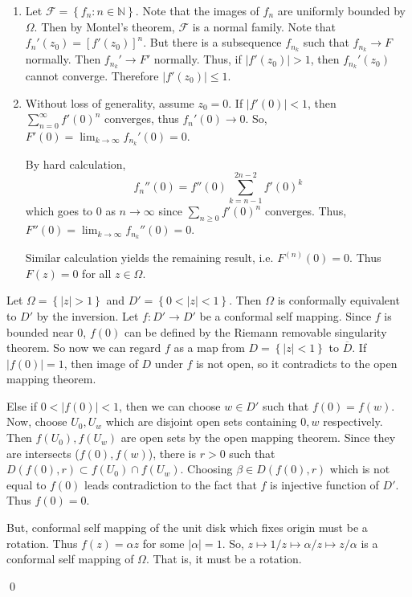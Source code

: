 \begin{problem}[7] \hfill

	\begin{enumerate}
		\item Let $\mathcal{F} = \left\{ f_n : n\in \mathbb{N} \right\}$. 
			Note that the images of $f_n$ are uniformly bounded by $\Omega$.
			Then by Montel's theorem, $\mathcal{F}$ is a normal family.
			Note that $f_n'(z_0) = [f'(z_0)]^n$.
			But there is a subsequence $f_{n_k}$ such that $f_{n_k} \rightarrow F$ normally.
			Then $f_{n_k}' \rightarrow F'$ normally.
			Thus, if $|f'(z_0)| >1$, then $f_{n_k}'(z_0)$ cannot converge.
			Therefore $|f'(z_0)|\leq 1$.

		\item Without loss of generality, assume $z_0 = 0$.
			If $|f'(0)|<1$, then $\sum_{n=0}^\infty f'(0)^n$ converges, thus $f_n'(0) \rightarrow 0$.
			So, $F'(0) = \lim_{k\rightarrow \infty} f_{n_k}'(0) = 0$.
			
			By hard calculation, 
			\[
				f_n''(0) = f''(0)\sum_{k=n-1}^{2n-2}f'(0)^{k}
			\]
			which goes to $0$ as $n\rightarrow \infty$ since $\sum_{n\geq 0} f'(0)^n$ converges.
			Thus, $F''(0) = \lim_{k\rightarrow \infty} f_{n_k}''(0) = 0$.

			Similar calculation yields the remaining result, i.e. $F^{(n)}(0) = 0$.
			Thus $F(z) = 0$ for all $z \in \Omega$.
	\end{enumerate}
	
\end{problem}
\begin{problem}[8]\hfill

	Let $\Omega = \left\{  |z| > 1 \right\}$ and $D' = \left\{ 0 < |z| < 1 \right\}$.
	Then $\Omega$ is conformally equivalent to $D'$ by the inversion.
	Let $f : D' \rightarrow D'$ be a conformal self mapping.
	Since $f$ is bounded near $0$, $f(0)$ can be defined by the Riemann removable singularity theorem.
	So now we can regard $f$ as a map from $D = \left\{ |z|<1 \right\}$ to $\overline{D}$.
	If $|f(0)| = 1$, then image of $D$ under $f$ is not open, so it contradicts to the open mapping theorem.
	
	Else if $0 < |f(0)| < 1$, then we can choose $w \in D'$ such that $f(0) = f(w)$.
	Now, choose $U_0, U_w$ which are disjoint open sets containing $0, w$ respectively.
	Then $f(U_0), f(U_w)$ are open sets by the open mapping theorem.
	Since they are intersects ($f(0), f(w)$), there is $r>0$ such that $D(f(0), r) \subset f(U_0) \cap f(U_w)$.
	Choosing $\beta \in D(f(0), r)$ which is not equal to $f(0)$ leads contradiction to the fact that $f$ is injective function of $D'$.
	Thus $f(0) = 0$.

	But, conformal self mapping of the unit disk which fixes origin must be a rotation. Thus $f(z) = \alpha z$ for some $|\alpha| = 1$.
	So, $z \mapsto 1/z \mapsto \alpha/z \mapsto z/\alpha$ is a conformal self mapping of $\Omega$.
	That is, it must be a rotation.
	
	\qed
\end{problem}

